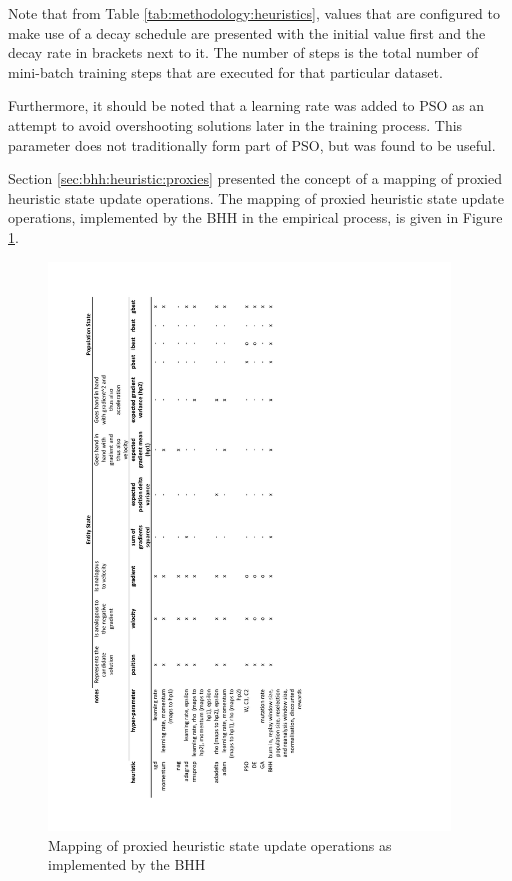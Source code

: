 \noindent
Note that from Table \ref{tab:methodology:heuristics}, values that are configured to make use of a decay schedule are presented with the initial value first and the decay rate in brackets next to it. The number of steps is the total number of mini-batch training steps that are executed for that particular dataset.

Furthermore, it should be noted that a learning rate was added to \acs{PSO} as an attempt to avoid overshooting solutions later in the training process. This parameter does not traditionally form part of \acs{PSO}, but was found to be useful.

Section \ref{sec:bhh:heuristic:proxies} presented the concept of a mapping of proxied heuristic state update operations. The mapping of proxied heuristic state update operations, implemented by the \acs{BHH} in the empirical process, is given in Figure \ref{fig:methodology:heuristics:proxies}.


\begin{figure}[htbp]
      \centering
      \includegraphics[width=0.95\textwidth]{images/bhh_heuristic_proxies.pdf}
      \caption{Mapping of proxied heuristic state update operations as implemented by the \acs{BHH}}
      \label{fig:methodology:heuristics:proxies}%
\end{figure}


